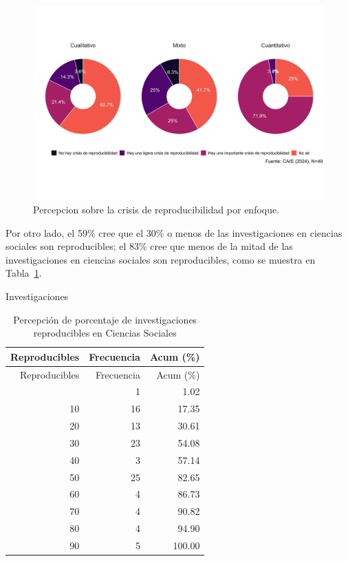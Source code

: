 \documentclass[
  letterpaper,
  DIV=11,
  numbers=noendperiod]{scrreprt}
\begin{document}
\begin{figure}

{\centering \includegraphics{paper_files/figure-pdf/fig-dona-grid-1.png}

}

\caption{\label{fig-dona-grid}Percepcion sobre la crisis de
reproducibilidad por enfoque.}

\end{figure}

Por otro lado, el 59\% cree que el 30\% o menos de las investigaciones
en ciencias sociales son reproducibles; el 83\% cree que menos de la
mitad de las investigaciones en ciencias sociales son reproducibles,
como se muestra en Tabla~\ref{tbl-tablaacum}.

Investigaciones

\hypertarget{tbl-tablaacum}{}
\begin{longtable}[]{@{}rrr@{}}
\caption{\label{tbl-tablaacum}Percepción de porcentaje de
investigaciones reproducibles en Ciencias Sociales}\tabularnewline
\toprule\noalign{}
Reproducibles & Frecuencia & Acum (\%) \\
\midrule\noalign{}
\endfirsthead
\toprule\noalign{}
Reproducibles & Frecuencia & Acum (\%) \\
\midrule\noalign{}
\endhead
\bottomrule\noalign{}
\endlastfoot
0 & 1 & 1.02 \\
10 & 16 & 17.35 \\
20 & 13 & 30.61 \\
30 & 23 & 54.08 \\
40 & 3 & 57.14 \\
50 & 25 & 82.65 \\
60 & 4 & 86.73 \\
70 & 4 & 90.82 \\
80 & 4 & 94.90 \\
90 & 5 & 100.00 \\
\end{longtable}
\end{document}
